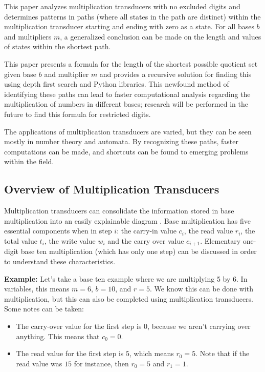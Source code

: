 \documentclass{article}
\begin{document}
 This paper analyzes multiplication transducers with no excluded digits and determines patterns in paths (where all states in the path are distinct) within the multiplication transducer starting and ending with zero as a state. For all bases $b$ and multipliers $m$, a generalized conclusion can be made on the length and values of states within the shortest path. \vspace{\baselineskip}
 
 This paper presents a formula for the length of the shortest possible quotient set given base $b$ and multiplier $m$ and provides a recursive solution for finding this using depth first search and Python libraries. This newfound method of identifying these paths can lead to faster computational analysis regarding the multiplication of numbers in different bases; research will be performed in the future to find this formula for restricted digits.  \vspace{\baselineskip}
 
 The applications of multiplication transducers are varied, but they can be seen mostly in number theory and automata. By recognizing these paths, faster computations can be made, and shortcuts can be found to emerging problems within the field.

\subsection{Overview of Multiplication Transducers}
\hspace*{5mm}Multiplication transducers can consolidate the information stored in base multiplication into an easily explainable diagram \cite{Blanchard1992} \cite{sisneros-thiry}. Base multiplication has five essential components when in step $i$: the carry-in value $c_i$, the read value $r_i$, the total value $t_i$, the write value $w_i$ and the carry over value $c_{i+1}$. Elementary one-digit base ten multiplication (which has only one step) can be discussed in order to understand these characteristics.  \vspace{\baselineskip}

\noindent
\textbf{Example:} Let's take a base ten example where we are multiplying 5 by 6. In variables, this means $m = 6$, $b = 10$, and $r = 5$. We know this can be done with multiplication, but this can also be completed using multiplication transducers. Some notes can be taken:
\begin{itemize}
    \item The carry-over value for the first step is $0$, because we aren't carrying over anything. This means that $c_0 = 0$.
    \item The read value for the first step is $5$, which means $r_0 = 5$. Note that if the read value was $15$ for instance, then $r_0 = 5$ and $r_1 = 1$. 
\end{itemize}
\end{document}
